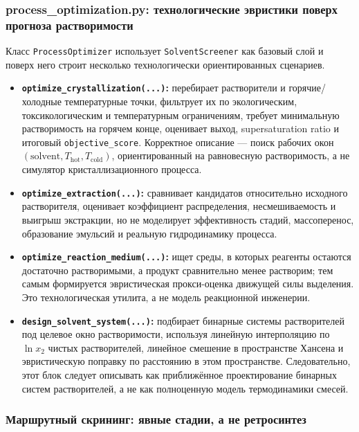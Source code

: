 \documentclass[11pt]{article}
\begin{document}
\subsubsection{process\_optimization.py: технологические эвристики поверх прогноза растворимости}

Класс \texttt{ProcessOptimizer} использует \texttt{SolventScreener} как базовый слой и поверх него строит несколько технологически ориентированных сценариев.

\begin{itemize}
  \item \textbf{\texttt{optimize\_crystallization(...)}:} перебирает растворители и горячие/холодные температурные точки, фильтрует их по экологическим, токсикологическим и температурным ограничениям, требует минимальную растворимость на горячем конце, оценивает выход, supersaturation ratio и итоговый \texttt{objective\_score}. Корректное описание --- поиск рабочих окон \((\text{solvent}, T_{\mathrm{hot}}, T_{\mathrm{cold}})\), ориентированный на равновесную растворимость, а не симулятор кристаллизационного процесса.
  \item \textbf{\texttt{optimize\_extraction(...)}:} сравнивает кандидатов относительно исходного растворителя, оценивает коэффициент распределения, несмешиваемость и выигрыш экстракции, но не моделирует эффективность стадий, массоперенос, образование эмульсий и реальную гидродинамику процесса.
  \item \textbf{\texttt{optimize\_reaction\_medium(...)}:} ищет среды, в которых реагенты остаются достаточно растворимыми, а продукт сравнительно менее растворим; тем самым формируется эвристическая прокси-оценка движущей силы выделения. Это технологическая утилита, а не модель реакционной инженерии.
  \item \textbf{\texttt{design\_solvent\_system(...)}:} подбирает бинарные системы растворителей под целевое окно растворимости, используя линейную интерполяцию по $\ln x_2$ чистых растворителей, линейное смешение в пространстве Хансена и эвристическую поправку по расстоянию в этом пространстве. Следовательно, этот блок следует описывать как приближённое проектирование бинарных систем растворителей, а не как полноценную модель термодинамики смесей.
\end{itemize}

\subsubsection{Маршрутный скрининг: явные стадии, а не ретросинтез}
\end{document}
